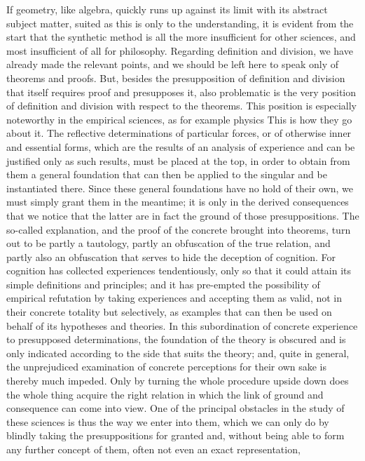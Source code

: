 If geometry, like algebra, quickly runs up against
its limit with its abstract subject matter,
suited as this is only to the understanding,
it is evident from the start that the synthetic method is
all the more insufficient for other sciences,
and most insufficient of all for philosophy.
Regarding definition and division,
we have already made the relevant points,
and we should be left here to speak
only of theorems and proofs.
But, besides the presupposition of definition and division
that itself requires proof and presupposes it,
also problematic is the very position of
definition and division with respect to the theorems.
This position is especially noteworthy in
the empirical sciences, as for example physics
This is how they go about it.
The reflective determinations of particular forces,
or of otherwise inner and essential forms,
which are the results of an analysis of experience
and can be justified only as such results,
must be placed at the top, in order to obtain
from them a general foundation
that can then be applied to the singular
and be instantiated there.
Since these general foundations have no hold of their own,
we must simply grant them in the meantime;
it is only in the derived consequences
that we notice that the latter are
in fact the ground of those presuppositions.
The so-called explanation,
and the proof of the concrete brought into theorems,
turn out to be partly a tautology,
partly an obfuscation of the true relation,
and partly also an obfuscation that serves
to hide the deception of cognition.
For cognition has collected experiences tendentiously,
only so that it could attain its simple definitions and principles;
and it has pre-empted the possibility of empirical refutation
by taking experiences and accepting them as valid,
not in their concrete totality but selectively,
as examples that can then be used on behalf of its
hypotheses and theories.
In this subordination of concrete experience to
presupposed determinations,
the foundation of the theory is obscured
and is only indicated according to
the side that suits the theory;
and, quite in general, the unprejudiced examination of
concrete perceptions for their own sake is thereby much impeded.
Only by turning the whole procedure upside down
does the whole thing acquire the right relation
in which the link of ground and consequence can come into view.
One of the principal obstacles in
the study of these sciences is
thus the way we enter into them,
which we can only do by blindly taking
the presuppositions for granted
and, without being able to form any further concept of them,
often not even an exact representation,
